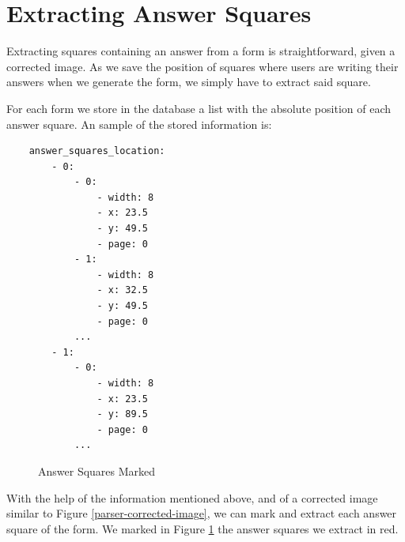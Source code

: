 \documentclass[11pt, a4paper]{report}
\begin{document}
\section{Extracting Answer Squares}

Extracting squares containing an answer from a form is straightforward, given a corrected image. As we save the position of squares where users are writing their answers when we generate the form, we simply have to extract said square.

For each form we store in the database a list with the absolute position of each answer square. An sample of the stored information is:

\begin{verbatim}
    answer_squares_location:
        - 0:
            - 0:
                - width: 8
                - x: 23.5
                - y: 49.5
                - page: 0
            - 1:
                - width: 8
                - x: 32.5
                - y: 49.5
                - page: 0
            ...
        - 1:
            - 0:
                - width: 8
                - x: 23.5
                - y: 89.5
                - page: 0
            ...
\end{verbatim}

\begin{figure}[!h]
	\centering
	\caption{Answer Squares Marked}
	\label{answer-squares-red}
\end{figure}


With the help of the information mentioned above, and of a corrected image similar to Figure \ref{parser-corrected-image}, we can mark and extract each answer square of the form. We marked in Figure \ref{answer-squares-red} the answer squares we extract in red.
\end{document}
